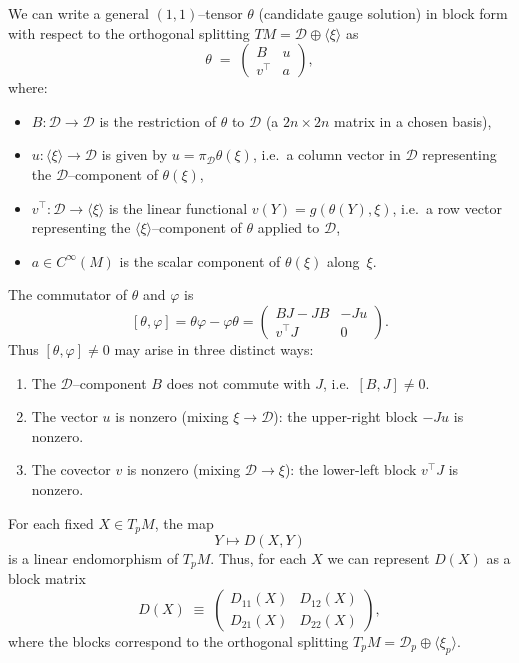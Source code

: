 We can write a general $(1,1)$--tensor $\theta$ (candidate gauge solution) 
in block form with respect to the orthogonal splitting 
$TM = \mathcal{D} \oplus \langle \xi \rangle$ as
\[
\theta \;=\; 
\begin{pmatrix}
B & u \\[4pt]
v^{\top} & a
\end{pmatrix},
\]
where:
\begin{itemize}
    \item $B : \mathcal{D} \to \mathcal{D}$ is the restriction of $\theta$ to $\mathcal{D}$
    (a $2n\times 2n$ matrix in a chosen basis),
    \item $u : \langle \xi \rangle \to \mathcal{D}$ is given by $u = \pi_{\mathcal{D}} \theta(\xi)$,
    i.e.\ a column vector in $\mathcal{D}$ representing the $\mathcal{D}$--component of $\theta(\xi)$,
    \item $v^{\top} : \mathcal{D} \to \langle \xi \rangle$ is the linear functional 
    $v(Y) = g(\theta(Y), \xi)$, i.e.\ a row vector representing the $\langle \xi \rangle$--component 
    of $\theta$ applied to $\mathcal{D}$,
    \item $a \in C^{\infty}(M)$ is the scalar component of $\theta(\xi)$ along~$\xi$.
\end{itemize}
The commutator of $\theta$ and $\varphi$ is
\[
[\theta,\varphi] 
= \theta\varphi - \varphi\theta
= \begin{pmatrix}
B J - J B & - J u \\[4pt]
v^{\top} J & 0
\end{pmatrix}.
\]
Thus $[\theta,\varphi] \neq 0$ may arise in three distinct ways:
\begin{enumerate}
    \item The $\mathcal{D}$--component $B$ does not commute with $J$, i.e.\ $[B,J] \neq 0$.
    \item The vector $u$ is nonzero (mixing $\xi \to \mathcal{D}$): the upper-right block $-J u$ is nonzero.
    \item The covector $v$ is nonzero (mixing $\mathcal{D} \to \xi$): the lower-left block $v^{\top} J$ is nonzero.
\end{enumerate}
For each fixed $X \in T_p M$, the map 
\[
Y \longmapsto D(X,Y)
\]
is a linear endomorphism of $T_p M$.  
Thus, for each $X$ we can represent $D(X)$ as a block matrix
\[
D(X) \;\equiv\;
\begin{pmatrix}
D_{11}(X) & D_{12}(X) \\[4pt]
D_{21}(X) & D_{22}(X)
\end{pmatrix},
\]
where the blocks correspond to the orthogonal splitting 
$T_p M = \mathcal{D}_p \oplus \langle \xi_p \rangle$.

